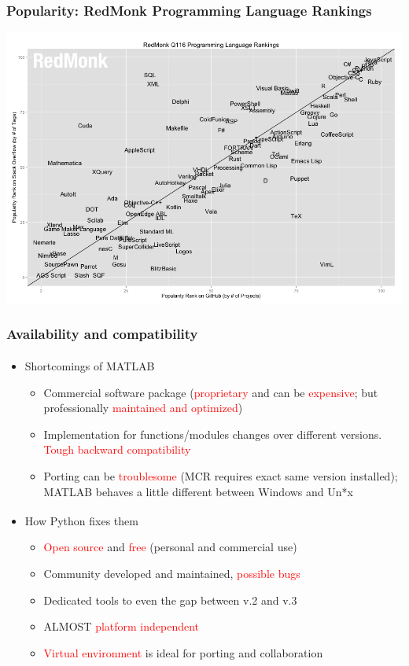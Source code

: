 \documentclass[compress]{beamer}
\begin{document}
\begin{frame}
	\frametitle{Popularity: RedMonk Programming Language Rankings}
	\centering
	\includegraphics[width=1.05\textwidth]{fig/redmonk}
\end{frame}

\begin{frame}
	\frametitle{Availability and compatibility}
	\begin{itemize}
		\item Shortcomings of MATLAB\textsuperscript{\textregistered}
		\begin{itemize}
			\item Commercial software package (\textcolor{red}{proprietary} and can be \textcolor{red}{expensive}; but professionally \textcolor{red}{maintained and optimized})
			\item Implementation for functions/modules changes over different versions. \textcolor{red}{Tough backward compatibility}
			\item Porting can be \textcolor{red}{troublesome} (MCR requires exact same version installed); MATLAB behaves a little different between Windows and Un*x
		\end{itemize}
		\item How Python\textsuperscript{\texttrademark} fixes them
		\begin{itemize}
			\item \textcolor{red}{Open source} and \textcolor{red}{free} (personal and commercial use)
			\item Community developed and maintained, \textcolor{red}{possible bugs}
			\item Dedicated tools to even the gap between v.2 and v.3
			\item ALMOST \textcolor{red}{platform independent}
			\item \textcolor{red}{Virtual environment} is ideal for porting and collaboration 
		\end{itemize}
	\end{itemize}
\end{frame}
\end{document}

